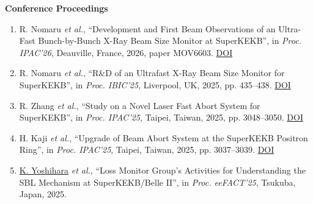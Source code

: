 \documentclass[11pt]{article}
\renewcommand{\labelenumi}{[\arabic{enumi}]}
\begin{document}
{{\normalsize\bfseries\color{LabOrange}Conference Proceedings}
\begin{enumerate}[itemsep=0pt]
\renewcommand{\labelenumi}{[\arabic{enumi}]}
\item{R. Nomaru \textit{et al.}, ``Development and First Beam Observations of an Ultra-Fast Bunch-by-Bunch X-Ray Beam Size Monitor at SuperKEKB'', in \textit{Proc. IPAC'26}, Deauville, France, 2026, paper MOV6603. \href{https://doi.org/10.18429/JACoW-IPAC2026-MOV6603}{DOI}}
\item{R. Nomaru \textit{et al.}, ``R\&D of an Ultrafast X-Ray Beam Size Monitor for SuperKEKB'', in \textit{Proc. IBIC'25}, Liverpool, UK, 2025, pp. 435--438. \href{https://doi.org/10.18429/JACoW-IBIC2025-TUPCO31}{DOI}}
\item{R. Zhang \textit{et al.}, ``Study on a Novel Laser Fast Abort System for SuperKEKB'', in \textit{Proc. IPAC'25}, Taipei, Taiwan, 2025, pp. 3048--3050. \href{https://doi.org/10.18429/JACoW-IPAC2025-THPS038}{DOI}}
\item{H. Kaji \textit{et al.}, ``Upgrade of Beam Abort System at the SuperKEKB Positron Ring'', in \textit{Proc. IPAC'25}, Taipei, Taiwan, 2025, pp. 3037--3039. \href{https://doi.org/10.18429/JACoW-IPAC2025-THPS033}{DOI}}
\item{\underline{K. Yoshihara} \textit{et al.}, ``Loss Monitor Group's Activities for Understanding the SBL Mechanism at SuperKEKB/Belle II'', in \textit{Proc. eeFACT'25}, Tsukuba, Japan, 2025.}
\end{enumerate}
}
\end{document}
